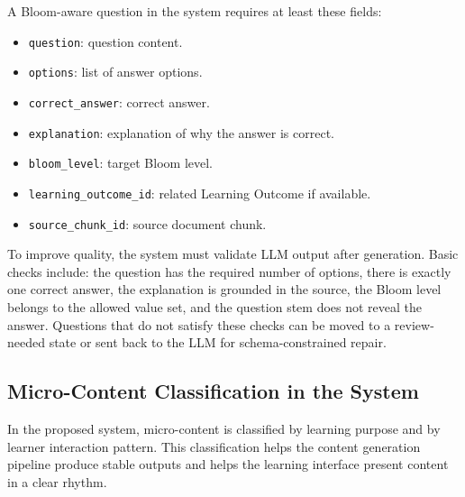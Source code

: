 A Bloom-aware question in the system requires at least these fields:

\begin{itemize}
    \item \texttt{question}: question content.
    \item \texttt{options}: list of answer options.
    \item \texttt{correct\_answer}: correct answer.
    \item \texttt{explanation}: explanation of why the answer is correct.
    \item \texttt{bloom\_level}: target Bloom level.
    \item \texttt{learning\_outcome\_id}: related Learning Outcome if available.
    \item \texttt{source\_chunk\_id}: source document chunk.
\end{itemize}

To improve quality, the system must validate LLM output after generation.
Basic checks include: the question has the required number of options,
there is exactly one correct answer, the explanation is grounded in the
source, the Bloom level belongs to the allowed value set, and the question
stem does not reveal the answer. Questions that do not satisfy these
checks can be moved to a review-needed state or sent back to the LLM for
schema-constrained repair.

\subsection{Micro-Content Classification in the System}
\label{subsec:phan-loai-micro-content}

In the proposed system, micro-content is classified by learning purpose
and by learner interaction pattern. This classification helps the content
generation pipeline produce stable outputs and helps the learning
interface present content in a clear rhythm.

